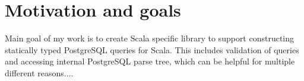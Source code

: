 \section{Motivation and goals}

Main goal of my work is to create Scala specific library to support constructing statically typed PostgreSQL queries for Scala. This includes validation of queries and accessing internal PostgreSQL parse tree, which can be helpful for multiple different reasons....
